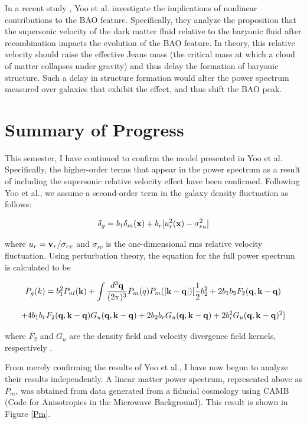 \documentclass[12pt]{article}
\begin{document}
In a recent study \cite{Yooetal}, Yoo et al. investigate the implications of nonlinear contributions to the BAO feature. Specifically, they analyze the proposition that the supersonic velocity of the dark matter fluid relative to the baryonic fluid after recombination impacts the evolution of the BAO feature. In theory, this relative velocity should raise the effective Jeans mass (the critical mass at which a cloud of matter collapses under gravity) and thus delay the formation of baryonic structure. Such a delay in structure formation would alter the power spectrum measured over galaxies that exhibit the effect, and thus shift the BAO peak.

\section{Summary of Progress}

This semester, I have continued to confirm the model presented in Yoo et al. Specifically, the higher-order terms that appear in the power spectrum as a result of including the supersonic relative velocity effect have been confirmed. Following Yoo et al., we assume a second-order term in the galaxy density fluctuation as follows:

$$\delta_{g}=b_{1}\delta_{m}({\bf x})+b_{r}[u_{r}^{2}({\bf x})-\sigma_{ru}^{2}]$$

where $u_{r} ={\bf v}_{r}/\sigma_{rv}$ and $\sigma_{rv}$ is the one-dimensional rms relative velocity fluctuation. Using perturbation theory, the equation for the full power spectrum is calculated to be 

$$P_{g}(k) = b_{1}^{2}P_{nl}({\bf k}) + \int\frac{d^{3}\bf q}{(2\pi)^{3}}P_{m}(q)P_{m}(|{\bf k - q}|)[\frac{1}{2}b_{2}^{2}+2b_{1}b_{2}F_{2}({\bf q, k- q})$$

$$+4b_{1}b_{r}F_{2}({\bf q, k- q})G_{u}({\bf q, k- q})+2b_{2}b_{r}G_{u}({\bf q, k- q})+2b_{r}^{2}G_{u}({\bf q, k- q})^{2}]$$

where $F_{2}$ and $G_{u}$ are the density field and velocity divergence field kernels, respectively \cite{Yooetal} \cite{Bernardeau}.

From merely confirming the results of Yoo et al., I have now begun to analyze their results independently. A linear matter power spectrum, represented above as $P_{m}$, was obtained from data generated from a fiducial cosmology using CAMB (Code for Anisotropies in the Microwave Background). This result is shown in Figure \ref{Pm}.
\end{document}
